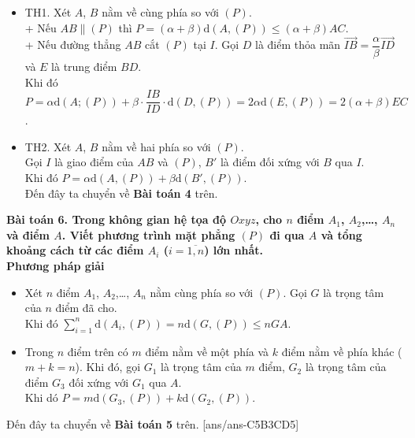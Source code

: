 \begin{itemize}
\item TH1. Xét  $A$, $B$ nằm về cùng phía so với $(P)$.\\
+ Nếu $AB\parallel (P)$ thì $P=\left(\alpha+\beta\right)\mathrm{d}(A,(P))\le \left(\alpha+\beta\right)AC$.\\
+ Nếu đường thẳng $AB$ cắt $(P)$ tại $I$. Gọi $D$ là điểm thỏa mãn $\overrightarrow{IB}=\dfrac{\alpha}{\beta}\overrightarrow{ID}$ và $E$ là trung điểm $BD$.\\
Khi đó $P=\alpha \mathrm{d}(A;(P))+\beta\cdot \dfrac{IB}{ID}\cdot \mathrm{d}(D,(P))=2\alpha \mathrm{d}(E,(P))=2\left(\alpha+\beta\right)EC$.
\item TH2. Xét $A$, $B$ nằm về hai phía so với $(P)$.\\
Gọi $I$ là giao điểm của $AB$ và $(P)$, $B'$ là điểm đối xứng với $B$ qua $I$.\\ 
Khi đó $P=\alpha \mathrm{d}(A,(P))+\beta \mathrm{d}(B',(P))$.\\
Đến đây ta chuyển về {\bf Bài toán 4} trên.
\end{itemize}
{\bf Bài toán 6. Trong không gian hệ tọa độ $Oxyz$, cho $n$ điểm $A_1$, $A_2$,\ldots, $A_n$ và điểm $A$. Viết phương trình mặt phẳng $(P)$ đi qua $A$ và tổng khoảng cách từ các điểm $A_i$ ($i=\overline{1,n}$) lớn nhất.}\\
{\bf Phương pháp giải}
\begin{itemize}
\item Xét $n$ điểm $A_1$, $A_2$,\ldots, $A_n$ nằm cùng phía so với $(P)$. Gọi $G$ là trọng tâm của $n$ điểm đã cho.\\ 
Khi đó $\sum\limits_{i=1}^{n}\mathrm{d}(A_i,(P))=n\mathrm{d}(G,(P))\le n GA$.
\item Trong $n$ điểm trên có $m$ điểm nằm về một phía và $k$ điểm nằm về phía khác ($m+k=n$). Khi đó, gọi $G_1$ là trọng tâm của $m$ điểm, $G_2$ là trọng tâm của  điểm $G_3$ đối xứng với $G_1$ qua $A$.\\
Khi dó $P=m \mathrm{d}(G_3,(P))+k\mathrm{d}(G_2,(P))$.
\end{itemize}
Đến đây ta chuyển về {\bf Bài toán 5} trên.
[ans/ans-C5B3CD5]
\TN
